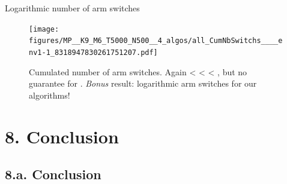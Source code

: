 \documentclass[12pt,english,ignorenonframetext,aspectratio=169,]{beamer}
\begin{document}
\begin{frame}[plain]{Logarithmic number of arm switches}

\begin{figure}[h!]
\centering
\texttt{[image: figures/MP\_\_K9\_M6\_T5000\_N500\_\_4\_algos/all\_CumNbSwitchs\_\_\_\_env1-1\_8318947830261751207.pdf]}
\caption{\footnotesize{Cumulated number of arm switches. Again \textcolor{blue}{\rhoRand{}} < \textcolor{red}{\RandTopM{}} < \textcolor{bluegreen}{\Selfish{}} < \textcolor{yellowgreen}{\MCTopM{}}, but no guarantee for \textcolor{blue}{\rhoRand{}}. \emph{Bonus} result: logarithmic arm switches for our algorithms!}}
\end{figure}

\end{frame}







\section{\hfill{}8. Conclusion\hfill{}}
\subsection{\hfill{}8.a. Conclusion\hfill{}}
\end{document}
